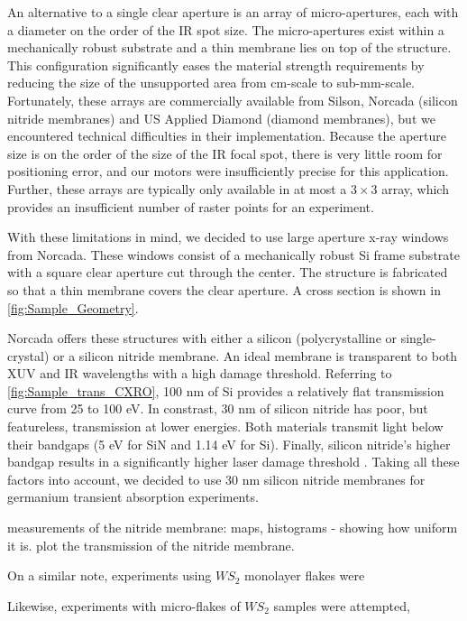 An alternative to a single clear aperture is an array of micro-apertures, each with a diameter on the order of the IR spot size. The micro-apertures exist within a mechanically robust substrate and a thin membrane lies on top of the structure. This configuration significantly eases the material strength requirements by reducing the size of the unsupported area from cm-scale to sub-mm-scale. Fortunately, these arrays are commercially available from Silson, Norcada (silicon nitride membranes) and US Applied Diamond (diamond membranes), but we encountered technical difficulties in their implementation. Because the aperture size is on the order of the size of the IR focal spot, there is very little room for positioning error, and our motors were insufficiently precise for this application. Further, these arrays are typically only available in at most a $3\times3$ array, which provides an insufficient number of raster points for an experiment.

With these limitations in mind, we decided to use large aperture x-ray windows from Norcada. These windows consist of a mechanically robust Si frame substrate with a square clear aperture cut through the center. The structure is fabricated so that a thin membrane covers the clear aperture. A cross section is shown in \cref{fig:Sample_Geometry}.

Norcada offers these structures with either a silicon (polycrystalline or single-crystal) or a silicon nitride membrane. An ideal membrane is transparent to both XUV and IR wavelengths with a high damage threshold. Referring to \cref{fig:Sample_trans_CXRO}, 100 nm of Si provides a relatively flat transmission curve from 25 to 100 eV. In constrast, 30 nm of silicon nitride has poor, but featureless, transmission at lower energies. Both materials transmit light below their bandgaps (5 eV for SiN and 1.14 eV for Si). Finally, silicon nitride's higher bandgap results in a significantly higher laser damage threshold \cite{gamalyAblationSolidsFemtosecond2002, austinFemtosecondLaserDamage2018, keldyshIonizationFieldStrong1965}. Taking all these factors into account, we decided to use 30 nm silicon nitride membranes for germanium transient absorption experiments.


measurements of the nitride membrane: maps, histograms - showing how uniform it is. plot the transmission of the nitride membrane.

On a similar note, experiments using $WS_2$ monolayer flakes were

Likewise, experiments with micro-flakes of $WS_2$ samples were attempted, 

